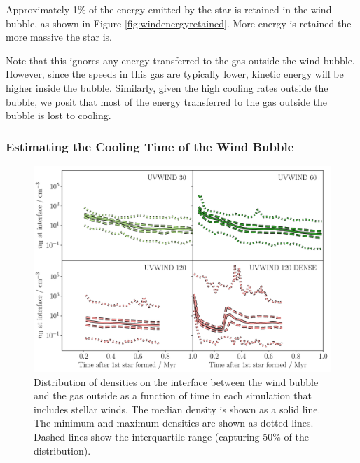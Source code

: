 \documentclass[a4paper,fleqn,usenatbib]{mnras}
\begin{document}
Approximately 1\% of the energy emitted by the star is retained in the wind bubble, as shown in Figure \ref{fig:windenergyretained}. More energy is retained the more massive the star is. 

Note that this ignores any energy transferred to the gas outside the wind bubble. However, since the speeds in this gas are typically lower, kinetic energy will be higher inside the bubble. Similarly, given the high cooling rates outside the bubble, we posit that most of the energy transferred to the gas outside the bubble is lost to cooling.

\subsubsection{Estimating the Cooling Time of the Wind Bubble}

\begin{figure}
	\includegraphics[width=1.98\columnwidth]{../plots/findHIIdensities.pdf}
	\caption{Distribution of densities on the interface between the wind bubble and the gas outside as a function of time in each simulation that includes stellar winds. The median density is shown as a solid line. The minimum and maximum densities are shown as dotted lines. Dashed lines show the interquartile range (capturing 50\% of the distribution).}
	\label{fig:findHIIdensities}
\end{figure}
\end{document}
